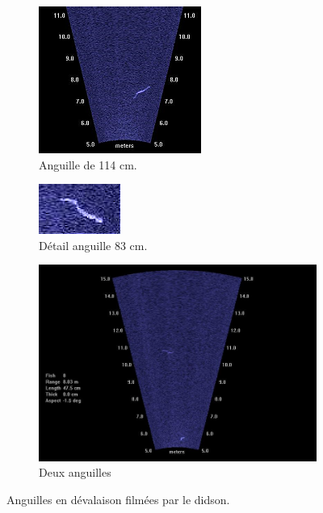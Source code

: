 \documentclass[11pt,twocolumn,titlepage,twoside]{article}
\begin{document}
\begin{figure}[htbp]
        \centering
        \begin{subfigure}{0.2\textwidth}
                \centering
                \includegraphics{anguille_114}
                \caption{Anguille de 114 cm.}
       \end{subfigure}%
       \quad
        \begin{subfigure}{0.2\textwidth}
                \centering
                \includegraphics{anguille_detail}
                \caption{Détail anguille 83 cm.}
       \end{subfigure}%
       \quad
      \begin{subfigure}{0.4\textwidth}
                \centering
                \includegraphics{anguilles}
                \caption{Deux anguilles}
                \label{ang0}
        \end{subfigure}%
        \caption[Anguilles.]{Anguilles en dévalaison filmées par le didson.}
       \label{fig_anguilles}
\end{figure}
\end{document}
